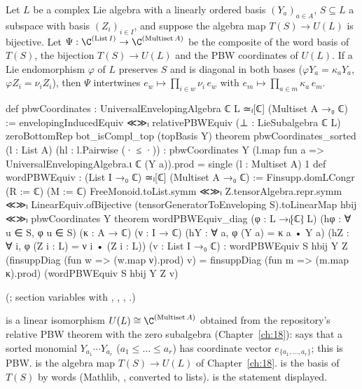 \begin{theorem}\label{ch19:thm:wordpbw}
Let $L$ be a complex Lie algebra with a linearly ordered basis $(Y_a)_{a\in A}$, $S\subseteq L$ a subspace with basis
$(Z_i)_{i\in I}$, and suppose the algebra map $T(S)\to U(L)$ is bijective.  Let $\Psi:\C^{(\mathrm{List}\,I)}\to\C^{(\mathrm{Multiset}\,A)}$
be the composite of the word basis of $T(S)$, the bijection $T(S)\to U(L)$ and the PBW coordinates of $U(L)$.  If a Lie
endomorphism $\varphi$ of $L$ preserves $S$ and is diagonal in both bases ($\varphi Y_a=\kappa_aY_a$, $\varphi Z_i=\nu_iZ_i$), then
$\Psi$ intertwines $e_w\mapsto\prod_{i\in w}\nu_i\,e_w$ with $e_m\mapsto\prod_{a\in m}\kappa_a\,e_m$.
\end{theorem}
\begin{leancode}
def pbwCoordinates : UniversalEnvelopingAlgebra ℂ L ≃ₗ[ℂ] (Multiset A →₀ ℂ) :=
  envelopingInducedEquiv ≪≫ₗ
    relativePBWEquiv (⊥ : LieSubalgebra ℂ L) zeroBottomRep bot_isCompl_top (topBasis Y)
theorem pbwCoordinates_sorted (l : List A) (hl : l.Pairwise (· ≤ ·)) :
    pbwCoordinates Y (l.map fun a => UniversalEnvelopingAlgebra.ι ℂ (Y a)).prod =
      single (l : Multiset A) 1
def wordPBWEquiv : (List I →₀ ℂ) ≃ₗ[ℂ] (Multiset A →₀ ℂ) :=
  Finsupp.domLCongr (R := ℂ) (M := ℂ) FreeMonoid.toList.symm ≪≫ₗ Z.tensorAlgebra.repr.symm ≪≫ₗ
    LinearEquiv.ofBijective (tensorGeneratorToEnveloping S).toLinearMap hbij ≪≫ₗ pbwCoordinates Y
theorem wordPBWEquiv_diag (φ : L →ₗ⁅ℂ⁆ L) (hφ : ∀ u ∈ S, φ u ∈ S) (κ : A → ℂ) (ν : I → ℂ)
    (hY : ∀ a, φ (Y a) = κ a • Y a) (hZ : ∀ i, φ (Z i : L) = ν i • (Z i : L))
    (v : List I →₀ ℂ) :
    wordPBWEquiv S hbij Y Z (finsuppDiag (fun w => (w.map ν).prod) v) =
      finsuppDiag (fun m => (m.map κ).prod) (wordPBWEquiv S hbij Y Z v)
\end{leancode}
(; section variables  with \lean{[LinearOrder A]},
, ,
.)
\begin{dictionary}
 is a linear isomorphism $U(L)\cong\C^{(\mathrm{Multiset}\,A)}$ obtained from the repository's relative PBW
theorem with the zero subalgebra (Chapter~\ref{ch:18}):  says that a sorted monomial
$Y_{a_1}\cdots Y_{a_r}$ ($a_1\le\dots\le a_r$) has coordinate vector $e_{\{a_1,\dots,a_r\}}$; this is PBW.
 is the algebra map $T(S)\to U(L)$ of Chapter~\ref{ch:18}.   is the
basis of $T(S)$ by words (Mathlib, , converted to lists).   is the statement
displayed.
\end{dictionary}
